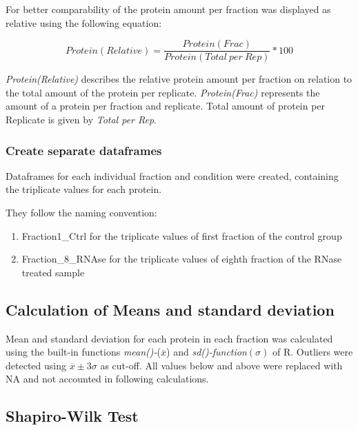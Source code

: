 \documentclass[
]{article}
\begin{document}
For better comparability of the protein amount per fraction was
displayed as relative using the following equation:

\[Protein(Relative) = \frac{Protein(Frac)}{Protein(Total\ per\ Rep)}*100\]

\emph{Protein(Relative)} describes the relative protein amount per
fraction on relation to the total amount of the protein per replicate.
\emph{Protein(Frac)} represents the amount of a protein per fraction and
replicate. Total amount of protein per Replicate is given by \emph{Total
per Rep}.

\hypertarget{create-separate-dataframes}{%
\subsubsection{Create separate
dataframes}\label{create-separate-dataframes}}

Dataframes for each individual fraction and condition were created,
containing the triplicate values for each protein.

They follow the naming convention:

\begin{enumerate}
\def\labelenumi{\arabic{enumi}.}
\item
  Fraction1\_Ctrl for the triplicate values of first fraction of the
  control group
\item
  Fraction\_8\_RNAse for the triplicate values of eighth fraction of the
  RNase treated sample
\end{enumerate}

\hypertarget{calculation-of-means-and-standard-deviation}{%
\subsection{Calculation of Means and standard
deviation}\label{calculation-of-means-and-standard-deviation}}

Mean and standard deviation for each protein in each fraction was
calculated using the built-in functions \emph{mean()-}(\(\overline x\))
and \emph{sd()-function}\((\sigma)\) of R. Outliers were detected using
\(\overline x \pm 3\sigma\) as cut-off. All values below and above were
replaced with NA and not accounted in following calculations.

\hypertarget{shapiro-wilk-test}{%
\subsection{Shapiro-Wilk Test}\label{shapiro-wilk-test}}
\end{document}
